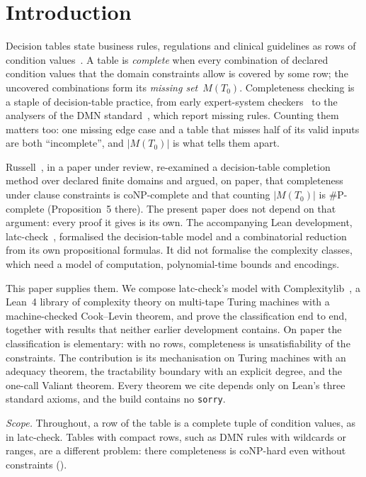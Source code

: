 \documentclass[pdflatex,sn-mathphys-num]{sn-jnl}
\theoremstyle{thmstyleone}
\theoremstyle{thmstylethree}
\begin{document}
\section{Introduction}
\label{sec:intro}

Decision tables state business rules, regulations and clinical guidelines as rows of
condition values~\cite{PollackHicksHarrison1971}. A table is \emph{complete} when every combination of declared condition
values that the domain constraints allow is covered by some row; the uncovered combinations
form its \emph{missing set}~$M(T_0)$. Completeness checking is a staple of decision-table
practice, from early expert-system checkers~\cite{SuwaScottShortliffe1982} to the analysers of
the DMN standard~\cite{CalvaneseDLMMT2016}, which report missing rules. Counting them matters
too: one missing edge case and a table that misses half of its valid inputs are both
``incomplete'', and $|M(T_0)|$ is what tells them apart.

Russell~\cite{PaperA}, in a paper under review, re-examined a decision-table completion method
over declared finite domains and argued, on paper, that completeness under clause constraints
is coNP-complete and that counting $|M(T_0)|$ is \#P-complete (Proposition~5 there). The
present paper does not depend on that argument: every proof it gives is its own. The
accompanying Lean development, latc-check~\cite{latc_check_0_1_0}, formalised the
decision-table model and a combinatorial reduction from its own propositional formulas. It did
not formalise the complexity classes, which need a model of computation, polynomial-time bounds
and encodings.

This paper supplies them. We compose latc-check's model with Complexitylib~\cite{Complexitylib},
a Lean~4 library of complexity theory on multi-tape Turing machines with a machine-checked
Cook--Levin theorem, and prove the classification end to end, together with results that neither
earlier development contains. On paper the classification is elementary: with no rows,
completeness is unsatisfiability of the constraints. The contribution is its mechanisation on
Turing machines with an adequacy theorem, the tractability boundary with an explicit degree, and
the one-call Valiant theorem. Every theorem we cite depends only on Lean's three standard
axioms, and the build contains no \lstinline{sorry}.

\emph{Scope.} Throughout, a row of the table is a complete tuple of condition values, as in
latc-check. Tables with compact rows, such as DMN rules with wildcards or ranges, are a different
problem: there completeness is coNP-hard even without constraints ().
\end{document}
